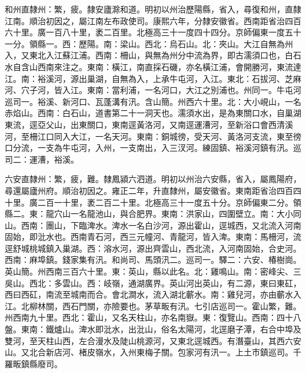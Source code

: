\begin{pinyinscope}
和州直隸州：繁，疲。隸安廬滁和道。明初以州治歷陽縣，省入，尋復和州，直隸江南。順治初因之，屬江南左布政使司。康熙六年，分隸安徽省。西南距省治四百六十里。廣一百八十里，袤二百里。北極高三十一度四十四分。京師偏東一度五十一分。領縣一。西：歷陽。南：梁山。西北：烏石山。北：夾山。大江自無為州入，又東北入江蘇江浦。西南：柵山，與無為州分中流為界，即古濡須口也，白石水自含山西南來注之。東南：橫江，南直採石磯，亦名橫江浦，會開勝河，東流達江。南：裕溪河，源出巢湖，自無為入，上承牛屯河，入江。東北：石拔河、芝麻河、穴子河，皆入江。東南：當利浦，一名河口，大江之別浦也。州同一。牛屯河巡司一。裕溪、新河口、瓦蓬溝有汛。含山簡。州西六十里。北：大小峴山，一名赤焰山。西南：白石山，道書第二十一洞天也。濡須水出，是為東關口水，自巢湖東流，逕亞父山，出東關口，東南逕黃洛河，又南逕運漕河，至新浴口會西清溪河，至柵江口同入大江，一名天河。東南：銅城徬，受天河、黃洛河支流，東至徬口分流，一支為牛屯河，入州，一支南出，入三汊河。練固鎮、裕溪河鎮有汛。巡司二：運漕，裕溪。

六安直隸州：繁，疲，難。隸鳳潁六泗道。明初以州治六安縣，省入，屬鳳陽府，尋還屬廬州府。順治初因之。雍正二年，升直隸州，屬安徽省。東南距省治四百四十里。廣二百一十里，袤二百二十里。北極高三十一度五十分。京師偏東二分。領縣二。東：龍穴山一名龍池山，與合肥界。東南：洪家山，四圍壁立。南：大小同山。西南：團山，下臨渒水。渒水一名白沙河，源出霍山，逕城西，又北流入河南固始，即沘水也。西南青石河，西三元幢河、青龍河，皆入渒。東南：馬柵河，流逕舒城桃城鎮入巢湖。西：溶水河，源出齊雲山，西北流，入河南固始，合史河。西南：麻埠鎮。錢家集有汛。和尚司、馬頭汛二。巡司一。驛二：六安、椿樹崗。英山簡。州西南三百六十里。東：英山，縣以此名。北：雞鳴山。南：密峰尖、三吳山。西北：多雲山。西：岐嶺，通湖廣界。英山河出英山，有二源，東曰東矼，西曰西矼，南流至城南而合。會北澗水，流入湖北蘄水。南：雞兒河，亦由蘄水入江。北柳林關，西石門關，亦險要也。茅草畈有汛。七引店巡司一。霍山繁，難。州西南九十里。西北：霍山，又名天柱山，亦名南嶽。東：復覽山。西南：四十八盤。東南：鐵爐山。渒水即沘水，出沘山，俗名太陽河，北逕磨子潭，右合中埠及雙河，至天柱山西，左合漫水及陡山桃源河，又東北逕城西。有潛臺山，其西六安山。又北合新店河、楮皮嶺水，入州東梅子關。包家河有汛一。上土市鎮巡司。千羅畈鎮縣廢司。


\end{pinyinscope}
